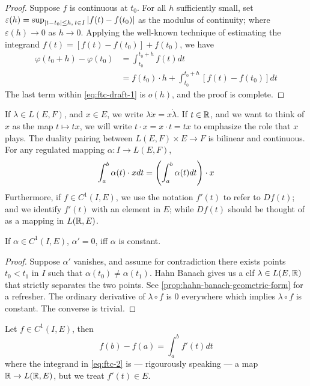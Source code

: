 \documentclass[../main-v2-manifolds.tex]{subfiles}
\begin{document}
\begin{proof}
    Suppose $f$ is continuous at $t_0$. For all $h$ sufficiently small, set $\varepsilon(h) = \sup_{{\vert {t-t_0} \vert\leq h, \: t\in I}}\vert {f(t) - f(t_0)} \vert$ as the modulus of continuity; where $\varepsilon(h)\to 0$ as $h\to 0$. Applying the well-known technique of estimating the integrand $f(t) = [f(t) - f(t_0)] + f(t_0)$, we have
    \begin{align}
        \varphi(t_0 + h) - \varphi(t_0) &= \int_{t_0}^{t_0 + h}f(t) dt\nonumber\\
        &= f(t_0)\cdot h + \int_{t_0}^{t_0 + h}[f(t) - f(t_0)]dt\label{eq:ftc-draft-1}
    \end{align}
    The last term within \cref{eq:ftc-draft-1} is $o(h)$, and the proof is complete.
\end{proof}
If $\lambda\in L(E,F)$, and $x\in E$, we write $\lambda \dot x = x\dot \lambda$. If $t\in \mathbb{R}$, and we want to think of $x$ as the map $t\mapsto tx$, we will write $t\cdot x = x\cdot t = tx$ to emphasize the role that $x$ plays. The duality pairing between $L(E,F)\times E\to F$ is bilinear and continuous. For any regulated mapping $\alpha: I\to L(E,F)$, 
\begin{equation}\label{eq:regulated-mapping-application}
    \int_a^b \alpha(t)\cdot x dt = \qty(\int_a^b \alpha(t) dt)\cdot x
\end{equation}
Furthermore, if $f\in C^1(I, E)$, we use the notation $f'(t)$ to refer to $Df(t)$; and we identify $f'(t)$ with an element in $E$; while $Df(t)$ should be thought of as a mapping in $L(\mathbb{R},E)$.
%
\begin{lemma}\label{lem:vanishing-derivative-implies-constant}
    If $\alpha\in C^1(I,E)$, $\alpha'=0$, iff $\alpha$ is constant.
\end{lemma}
\begin{proof}
    Suppose $\alpha'$ vanishes, and assume for contradiction there exists points $t_0< t_1$ in $I$ such that $\alpha(t_0)\neq \alpha(t_1)$. Hahn Banach gives us a clf $\lambda\in L(E,\mathbb{R})$ that strictly separates the two points. See \cref{prop:hahn-banach-geometric-form} for a refresher. The ordinary derivative of $\lambda\circ f$ is $0$ everywhere which implies $\lambda\circ f$ is constant. The converse is trivial.
\end{proof}
\begin{lemma}[FTC 2]\label{lem:ftc-2}
    Let $f\in C^1(I, E)$, then
    \begin{equation}\label{eq:ftc-2}
        f(b) - f(a) = \int_a^b f'(t)dt    
    \end{equation}
    where the integrand in \cref{eq:ftc-2} is --- rigourously speaking --- a map  $\mathbb{R}\to L(\mathbb{R},E)$, but we treat $f'(t)\in E$.
\end{lemma}
\end{document}

